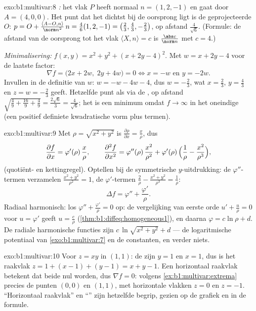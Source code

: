 \begin{solution}{exo:b1:multivar:8}
\emph{:} het vlak $P$ heeft normaal $n = (1, 2, -1)$ en
gaat door $A = (4, 0, 0)$. Het punt dat het dichtst bij de oorsprong
ligt is de geprojecteerde $O$: $p = O + \frac{\langle A - O,
n\rangle}{\norm n^2}\,n = \frac{4}{6}(1,2,-1) = \bigl(\frac23,
\frac43, -\frac23\bigr)$, op afstand $\frac{4}{\sqrt 6}$. (Formule:
de afstand van de oorsprong tot het vlak $\langle X, n \rangle = c$
is $\frac{\abs c}{\norm n}$ met $c = 4$.)

\emph{Minimalisering:} $f(x,y) = x^2 + y^2 + (x + 2y - 4)^2$. Met $w
= x + 2y - 4$ voor de laatste factor:
\[
\nabla f = \bigl(2x + 2w,\; 2y + 4w\bigr) = 0
\iff x = -w \text{ en } y = -2w .
\]
Invullen in de definitie van $w$: $w = -w - 4w - 4$, dus $w =
-\frac23$, wat $x = \frac23$, $y = \frac43$ en $z = w = -\frac23$
geeft. Hetzelfde punt als via de , op afstand
$\sqrt{\frac49 + \frac{16}{9} + \frac49} = \frac{2\sqrt 6}{3} =
\frac{4}{\sqrt6}$; het is een minimum omdat $f \to \infty$ in het
oneindige (een positief definiete kwadratische vorm plus 
termen).
\end{solution}

\begin{solution}{exo:b1:multivar:9}
Met $\rho = \sqrt{x^2+y^2}$ is $\frac{\partial \rho}{\partial x} =
\frac{x}{\rho}$, dus
\[
\frac{\partial f}{\partial x} = \varphi'(\rho)\,\frac{x}{\rho},
\qquad
\frac{\partial^2 f}{\partial x^2}
= \varphi''(\rho)\,\frac{x^2}{\rho^2}
+ \varphi'(\rho)\,\Bigl(\frac{1}{\rho} -
\frac{x^2}{\rho^3}\Bigr),
\]
(quotiënt- en kettingregel). Optellen bij de symmetrische
$y$-uitdrukking: de $\varphi''$-termen verzamelen $\frac{x^2 +
y^2}{\rho^2} = 1$, de $\varphi'$-termen $\frac{2}{\rho} -
\frac{x^2 + y^2}{\rho^3} = \frac{1}{\rho}$:
\[
\Delta f = \varphi'' + \frac{\varphi'}{\rho} .
\]
Radiaal harmonisch: los $\varphi'' + \frac{\varphi'}{\rho} = 0$ op:
de vergelijking van eerste orde $u' + \frac u\rho = 0$ voor $u =
\varphi'$ geeft $u = \frac{c}{\rho}$
(\cref{thm:b1:diffeq:homogeneous1}), en daarna $\varphi = c\ln\rho
+ d$. De radiale harmonische functies zijn $c\,\ln\sqrt{x^2 + y^2}
+ d$ --- de logaritmische potentiaal van \cref{exo:b1:multivar:7}
en de constanten, en verder niets.
\end{solution}

\begin{solution}{exo:b1:multivar:10}
Voor $z = xy$ in $(1,1)$: de  zijn $y = 1$ en $x
= 1$, dus is het raakvlak $z = 1 + (x - 1) + (y - 1) = x + y - 1$.
Een horizontaal raakvlak betekent dat beide  nul
worden, dus $\nabla f = 0$: volgens \cref{ex:b1:multivar:extrema}
precies de  punten $(0, 0)$ en $(1, 1)$, met horizontale
vlakken $z = 0$ en $z = -1$. ``Horizontaal raakvlak'' en ``'' zijn hetzelfde begrip, gezien op de grafiek en in de
formule.
\end{solution}

